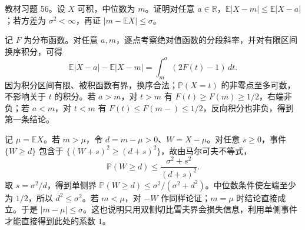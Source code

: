 \begin{example}
\label{ex:study-exercise4-56}
教材习题 56。设 $X$ 可积，中位数为 $m$。证明对任意 $a\in\mathbb R$，$\mathbb E|X-m|\le\mathbb E|X-a|$；若方差为 $\sigma^2<\infty$，再证 $|m-\mathbb E X|\le\sigma$。
\end{example}

\begin{solve}
记 $F$ 为分布函数。对任意 $a,m$，逐点考察绝对值函数的分段斜率，并对有限区间换序积分，可得
\[
  \mathbb E|X-a|-\mathbb E|X-m|
    =\int_m^a(2F(t)-1)\,dt.
\]
因为积分区间有限、被积函数有界，换序合法；$\mathbb P(X=t)$ 的非零点至多可数，不影响关于 $t$ 的积分。若 $a>m$，对 $t>m$ 有 $F(t)\ge F(m)\ge1/2$，右端非负；若 $a<m$，对 $t<m$ 有 $F(t)\le F(m-)\le1/2$，反向积分也非负，得到第一条结论。

记 $\mu=\mathbb E X$。若 $m>\mu$，令 $d=m-\mu>0$、$W=X-\mu$。对任意 $s\ge0$，事件 $\{W\ge d\}$ 包含于 $\{(W+s)^2\ge(d+s)^2\}$，故由马尔可夫不等式，
\[
  \mathbb P(W\ge d)\le\frac{\sigma^2+s^2}{(d+s)^2}.
\]
取 $s=\sigma^2/d$，得到单侧界 $\mathbb P(W\ge d)\le\sigma^2/(\sigma^2+d^2)$。中位数条件使左端至少为 $1/2$，所以 $d^2\le\sigma^2$。若 $m<\mu$，对 $-W$ 作同样论证；$m=\mu$ 时结论直接成立。于是 $|m-\mu|\le\sigma$。这也说明只用双侧切比雪夫界会损失信息，利用单侧事件才能直接得到此处的系数 $1$。
\end{solve}





